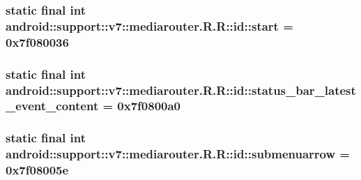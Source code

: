\hypertarget{classandroid_1_1support_1_1v7_1_1mediarouter_1_1_r_1_1id_f93947943521c9c5ccc706fc40333e22}{
\subsubsection[{start}]{\setlength{\rightskip}{0pt plus 5cm}static final int android::support::v7::mediarouter.R.R::id::start = 0x7f080036}}
\label{classandroid_1_1support_1_1v7_1_1mediarouter_1_1_r_1_1id_f93947943521c9c5ccc706fc40333e22}


\hypertarget{classandroid_1_1support_1_1v7_1_1mediarouter_1_1_r_1_1id_3e84951f3c75e58f62fa88441fc8b99e}{
\subsubsection[{status\_\-bar\_\-latest\_\-event\_\-content}]{\setlength{\rightskip}{0pt plus 5cm}static final int android::support::v7::mediarouter.R.R::id::status\_\-bar\_\-latest\_\-event\_\-content = 0x7f0800a0}}
\label{classandroid_1_1support_1_1v7_1_1mediarouter_1_1_r_1_1id_3e84951f3c75e58f62fa88441fc8b99e}


\hypertarget{classandroid_1_1support_1_1v7_1_1mediarouter_1_1_r_1_1id_b0e83e44dd625c2f9723881c06cc6cca}{
\subsubsection[{submenuarrow}]{\setlength{\rightskip}{0pt plus 5cm}static final int android::support::v7::mediarouter.R.R::id::submenuarrow = 0x7f08005e}}
\label{classandroid_1_1support_1_1v7_1_1mediarouter_1_1_r_1_1id_b0e83e44dd625c2f9723881c06cc6cca}


